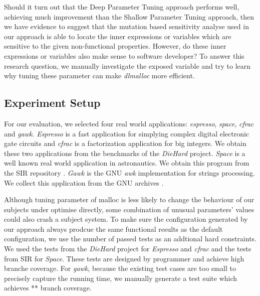 Should it turn out that the Deep Parameter Tuning approach performs well, achieving much improvement than the Shallow Parameter Tuning approach, then we have evidence to suggest that the mutation based sensitivity analyse used in our approach is able to locate the inner expressions or variables which are sensitive to the given non-functional properties. However, do these inner expressions or variables also make sense to software developer? To answer this research question, we manually investigate the exposed variable and try to learn why tuning these parameter can make \emph{dlmalloc} more efficient.  

\subsection{Experiment Setup}


\begin{table}[htbp]
\centering
\caption{Subject applications}
\label{tab_sub_app}
\end{table}

For our evaluation, we selected four real world applications: \emph{espresso}, \emph{space}, \emph{cfrac} and \emph{gawk}. \emph{Espresso} is a fast application for simplying complex digital electronic gate circuits and \emph{cfrac} is a factorization application for big integers. We obtain these two applications from the benchmarks of the \emph{DieHard} project\cite{Berger:2006:DPM:1133255.1134000}. \emph{Space} is a well known real world application in astronautics. We obtain this program from the SIR repository \cite{SIR2005}. \emph{Gawk} is the GNU \emph{awk} implementation for strings processing. We collect this application from the GNU archives \cite{}.

Although tuning parameter of malloc is less likely to change the behaviour of our subjects under optimise directly, some combination of unusual parameters' values could also crash a subject system. To make sure the configuration generated by our approach always prodcue the same functional results as the default configuration, we use the number of passed tests as an addtional hard constraints. We used the tests from the \emph{DieHard} project for \emph{Espresso} and \emph{cfrac} and the tests from SIR for \emph{Space}. These tests are designed by programmer and achieve high branche coverage. For \emph{gawk}, because the existing test cases are too small to precisely capture the running time, we manually generate a test suite which achieves ** branch coverage.


